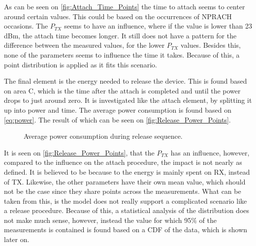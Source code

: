 As can be seen on \autoref{fig:Attach_Time_Points} the time to attach seems to center around certain values. This could be based on the occurrences of NPRACH occasions. The $P_{TX}$ seems to have an influence, where if the value is lower than 23 dBm, the attach time becomes longer. It still does not have a pattern for the difference between the measured values, for the lower $P_{TX}$ values. Besides this, none of the parameters seems to influence the time it takes. Because of this, a point distribution is applied as it fits this scenario. 

The final element is the energy needed to release the device. This is found based on area C, which is the time after the attach is completed and until the power drops to just around zero. It is investigated like the attach element, by splitting it up into power and time. The average power consumption is found based on \autoref{eq:power}. The result of which can be seen on \autoref{fig:Release_Power_Points}.

\begin{figure}[H]
\centering
\begin{minipage}{0.48\textwidth}
\resizebox{\textwidth}{!}{
}
\end{minipage}
\hfill
\begin{minipage}{0.48\textwidth}
\resizebox{\textwidth}{!}{
}
\end{minipage}
\caption{Average power consumption during release sequence.}
\label{fig:Release_Power_Points}
\end{figure}

It is seen on \autoref{fig:Release_Power_Points}, that the $P_{TX}$ has an influence, however, compared to the influence on the attach procedure, the impact is not nearly as defined. It is believed to be because to the energy is mainly spent on RX, instead of TX. Likewise, the other parameters have their own mean value, which should not be the case since they share points across the measurements. What can be taken from this, is the model does not really support a complicated scenario like a release procedure. Because of this, a statistical analysis of the distribution does not make much sense, however, instead the value for which 95\% of the measurements is contained is found based on a CDF of the data, which is shown later on. 

